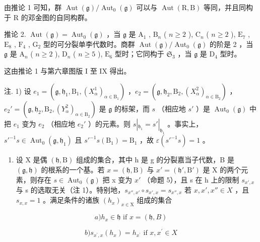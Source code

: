 由推论 1 可知，群 \(\operatorname{Aut}(\mathfrak{g})/\operatorname{Aut}_{0}(\mathfrak{g})\) 可以与 \(\operatorname{Aut}(\mathrm{R},\mathrm{B})\) 等同，并且同构于 R 的邓金图的自同构群。

推论 2. \(\operatorname{Aut}(\mathfrak{g}) = \operatorname{Aut}_0(\mathfrak{g})\) ，当 \(\mathfrak{g}\) 是 \(\mathrm{A}_1\) , \(\mathrm{B}_n\) ( \(n \geq 2\) ), \(\mathrm{C}_n\) ( \(n \geq 2\) ), \(\mathrm{E}_7\) , \(\mathrm{E}_8\) , \(\mathrm{F}_4\) , \(\mathrm{G}_2\) 型的可分裂单李代数时。商群 \(\operatorname{Aut}(\mathfrak{g}) / \operatorname{Aut}_0(\mathfrak{g})\) 的阶是 2 ，当 \(\mathfrak{g}\) 是 \(\mathrm{A}_n\) ( \(n \geq 2\) ), \(\mathrm{D}_n\) ( \(n \geq 5\) ), \(\mathrm{E}_6\) 型时；它同构于 \(\mathfrak{S}_3\) ，当 \(\mathfrak{g}\) 是 \(\mathrm{D}_4\) 型时。

这由推论 1 与第六章图版 I 至 IX 得出。

注. 1) 设 \(e_1 = (\mathfrak{g}, \mathfrak{h}_1, \mathrm{B}_1, (X_\alpha^1)_{\alpha \in \mathrm{B}_1})\) ，\(e_2 = (\mathfrak{g}, \mathfrak{h}_2, \mathrm{B}_2, (X_\alpha^2)_{\alpha \in \mathrm{B}_2})\) ，\(e_2' = (\mathfrak{g}, \mathfrak{h}_2, \mathrm{B}_2, (Y_\alpha^2)_{\alpha \in \mathrm{B}_2})\) 是 \(\mathfrak{g}\) 的标架，而 \(s\) （相应地 \(s'\) ）是 \(\operatorname{Aut}_0(\mathfrak{g})\) 中把 \(e_1\) 变为 \(e_2\) （相应地 \(e_2'\) ）的元素。则 \(s|_{\mathfrak{h}_1} = s'|_{\mathfrak{h}_1}\) 。事实上，\(s'^{-1}s \in \operatorname{Aut}_0(\mathfrak{g}, \mathfrak{h}_1)\) 且 \(s'^{-1}s(\mathrm{B}_1) = \mathrm{B}_1\) ，故 \(\varepsilon(s'^{-1}s) = 1\) 。

\begin{enumerate}
\def\labelenumi{\arabic{enumi})}
\setcounter{enumi}{1}
\tightlist
\item
  设 X 是偶 \((\mathfrak{h},\mathrm{B})\) 组成的集合，其中 h 是 g 的分裂嘉当子代数，B 是 \((\mathfrak{g},\mathfrak{h})\) 的根系的一个基。若 \(x=(\mathfrak{h},\mathrm{B})\) 与 \(x'=(\mathfrak{h}',\mathrm{B}')\) 是 X 的两个元素，则存在 \(s\in\operatorname{Aut}_{0}(\mathfrak{g})\) 把 x 变为 \(x'\) （命题 5），且 s 在 h 上的限制 \(s_{x',x}\) 与 s 的选取无关（注 1）。特别地，\(s_{x'',x'}\circ s_{x',x}=s_{x'',x}\) 若 \(x,x',x''\in X\) ，且 \(s_{x,x}=1\) 。满足条件的诸族 \((h_{x})_{x\in\mathrm{X}}\) 组成的集合
\end{enumerate}

\[
a) h _ {x} \in \mathfrak {h} \text {   if   } x = (\mathfrak {h}, B)
\]

\[
b) s _ {x ^ {\prime}, x} (h _ {x}) = h _ {x ^ {\prime}} \text { if } x, x ^ {\prime} \in X
\]

